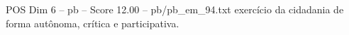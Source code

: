\begin{textsample}{POS Dim 6 – pb – Score 12.00 – pb/pb\_em\_94.txt}
exercício da cidadania de forma autônoma, crítica e participativa.

\end{textsample}
